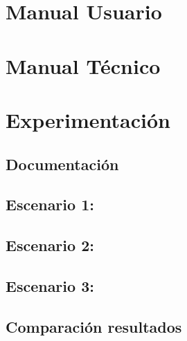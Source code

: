 \documentclass{article}
\begin{document}

\section{Manual Usuario}\label{sec:man_u}



\section{Manual Técnico}\label{sec:man_t}



\section{Experimentación}\label{sec:exp}

\subsection{Documentación}


\subsection{Escenario 1:}


\subsection{Escenario 2:}

\subsection{Escenario 3:}

\subsection{Comparación resultados}

\end{document}

